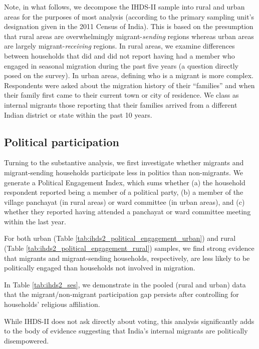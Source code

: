 \documentclass[
  11.5pt,
]{article}
\begin{document}
Note, in what follows, we decompose the IHDS-II sample into rural and
urban areas for the purposes of most analysis (according to the primary
sampling unit's designation given in the 2011 Census of India). This is
based on the presumption that rural areas are overwhelmingly
migrant-\textit{sending} regions whereas urban areas are largely
migrant-\textit{receiving} regions. In rural areas, we examine
differences between households that did and did not report having had a
member who engaged in seasonal migration during the past five years (a
question directly posed on the survey). In urban areas, defining who is
a migrant is more complex. Respondents were asked about the migration
history of their ``families'' and when their family first came to their
current town or city of residence. We class as internal migrants those
reporting that their families arrived from a different Indian district
or state within the past 10 years.

\subsection{Political participation}

Turning to the substantive analysis, we first investigate whether
migrants and migrant-sending households participate less in politics
than non-migrants. We generate a Political Engagement Index, which sums
whether (a) the household respondent reported being a member of a
political party, (b) a member of the village panchayat (in rural areas)
or ward committee (in urban areas), and (c) whether they reported having
attended a panchayat or ward committee meeting within the last year.

For both urban (Table \ref{tab:ihds2_political_engagement_urban}) and
rural (Table \ref{tab:ihds2_political_engagement_rural}) samples, we
find strong evidence that migrants and migrant-sending households,
respectively, are less likely to be politically engaged than households
not involved in migration.

In Table \ref{tab:ihds2_ses}, we demonstrate in the pooled (rural and
urban) data that the migrant/non-migrant participation gap persists
after controlling for households' religious affiliation.

While IHDS-II does not ask directly about voting, this analysis
significantly adds to the body of evidence suggesting that India's
internal migrants are politically disempowered.
\end{document}
